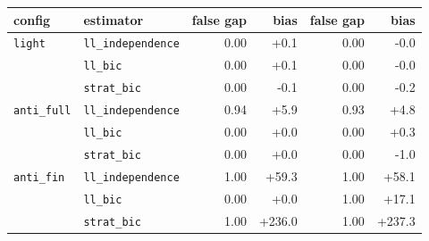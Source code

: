\begin{tabular}{llrrrr}
\toprule
config & estimator & false gap & bias & false gap & bias \\
\midrule
\texttt{light} & \texttt{ll\_independence} & 0.00 & +0.1 & 0.00 & -0.0 \\
 & \texttt{ll\_bic} & 0.00 & +0.1 & 0.00 & -0.0 \\
 & \texttt{strat\_bic} & 0.00 & -0.1 & 0.00 & -0.2 \\
\texttt{anti\_full} & \texttt{ll\_independence} & 0.94 & +5.9 & 0.93 & +4.8 \\
 & \texttt{ll\_bic} & 0.00 & +0.0 & 0.00 & +0.3 \\
 & \texttt{strat\_bic} & 0.00 & +0.0 & 0.00 & -1.0 \\
\texttt{anti\_fin} & \texttt{ll\_independence} & 1.00 & +59.3 & 1.00 & +58.1 \\
 & \texttt{ll\_bic} & 0.00 & +0.0 & 1.00 & +17.1 \\
 & \texttt{strat\_bic} & 1.00 & +236.0 & 1.00 & +237.3 \\
\bottomrule
\end{tabular}
\par{}
